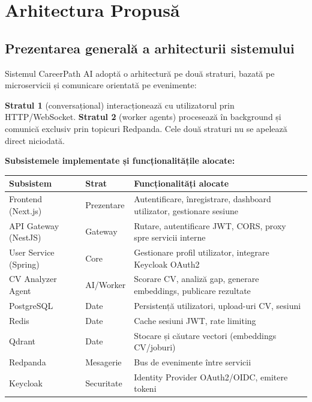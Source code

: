 \documentclass[12pt, a4paper]{report}
\begin{document}
\chapter{Arhitectura Propusă}

\section{Prezentarea generală a arhitecturii sistemului}

Sistemul CareerPath AI adoptă o arhitectură pe două straturi, bazată pe microservicii
și comunicare orientată pe evenimente:

\begin{notabox}[title={Principiu arhitectural fundamental}]
\textbf{Stratul 1} (conversațional) interacționează cu utilizatorul prin HTTP/WebSocket.
\textbf{Stratul 2} (worker agents) procesează în background și comunică exclusiv
prin topicuri Redpanda. Cele două straturi nu se apelează direct niciodată.
\end{notabox}

\vspace{0.5cm}

\textbf{Subsistemele implementate și funcționalitățile alocate:}

\begin{center}
\begin{tabularx}{\textwidth}{llX}
\toprule
\rowcolor{primary!15}
\textbf{Subsistem} & \textbf{Strat} & \textbf{Funcționalități alocate} \\
\midrule
Frontend (Next.js) & Prezentare & Autentificare, înregistrare, dashboard utilizator, gestionare sesiune \\
API Gateway (NestJS) & Gateway & Rutare, autentificare JWT, CORS, proxy spre servicii interne \\
User Service (Spring) & Core & Gestionare profil utilizator, integrare Keycloak OAuth2 \\
CV Analyzer Agent & AI/Worker & Scorare CV, analiză gap, generare embeddings, publicare rezultate \\
PostgreSQL & Date & Persistență utilizatori, upload-uri CV, sesiuni \\
Redis & Date & Cache sesiuni JWT, rate limiting \\
Qdrant & Date & Stocare și căutare vectori (embeddings CV/joburi) \\
Redpanda & Mesagerie & Bus de evenimente între servicii \\
Keycloak & Securitate & Identity Provider OAuth2/OIDC, emitere tokeni \\
\bottomrule
\end{tabularx}
\end{center}
\end{document}
